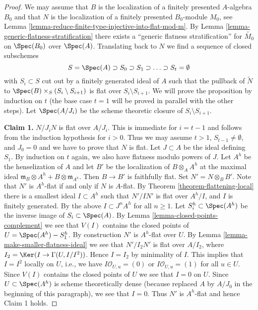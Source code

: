 \begin{proof}
We may assume that $B$ is the localization of a finitely presented
$A$-algebra $B_0$ and that $N$ is the localization of a
finitely presented $B_0$-module $M_0$, see
Lemma \ref{lemma-reduce-finite-type-injective-into-flat-mod-m}.
By Lemma \ref{lemma-generic-flatness-stratification}
there exists a ``generic flatness stratification''
for $\widetilde{M_0}$ on $\Spec(B_0)$ over $\Spec(A)$.
Translating back to $N$ we find a sequence of closed subschemes
$$
S = \Spec(A) \supset S_0 \supset S_1 \supset \ldots \supset S_t = \emptyset
$$
with $S_i \subset S$ cut out by a finitely generated ideal of $A$
such that the pullback of $\widetilde{N}$ to
$\Spec(B) \times_S (S_i \setminus S_{i + 1})$ is flat over
$S_i \setminus S_{i + 1}$. We will prove the proposition by
induction on $t$ (the base case $t = 1$ will be proved in parallel
with the other steps). Let $\Spec(A/J_i)$ be the scheme theoretic
closure of $S_i \setminus S_{i + 1}$.

\medskip\noindent
{\bf Claim 1.} $N/J_iN$ is flat over $A/J_i$. This is immediate for
$i = t - 1$ and follows from the induction hypothesis for $i > 0$.
Thus we may assume $t > 1$, $S_{t - 1} \not = \emptyset$, and
$J_0 = 0$ and we have to prove that $N$ is flat. Let $J \subset A$
be the ideal defining $S_1$. By induction on $t$ again, we also
have flatness modulo powers of $J$. Let $A^h$ be the henselization of $A$
and let $B'$ be the localization of $B \otimes_A A^h$ at the maximal ideal
$\mathfrak m_B \otimes A^h + B \otimes \mathfrak m_{A^h}$. Then $B \to B'$
is faithfully flat. Set $N' = N \otimes_B B'$. Note that $N'$
is $A^h$-flat if and only if $N$ is $A$-flat. By
Theorem \ref{theorem-flattening-local} there is a smallest ideal
$I \subset A^h$ such that $N'/IN'$ is flat over $A^h/I$, and
$I$ is finitely generated. By the above $I \subset J^nA^h$ for
all $n \geq 1$. Let $S_i^h \subset \Spec(A^h)$ be the inverse image
of $S_i \subset \Spec(A)$. By Lemma \ref{lemma-closed-points-complement}
we see that $V(I)$ contains the closed points of $U = \Spec(A^h) - S_1^h$.
By construction $N'$ is $A^h$-flat over $U$.
By Lemma \ref{lemma-make-smaller-flatness-ideal} we see that $N'/I_2N'$
is flat over $A/I_2$, where
$I_2 = \Ker(I \to \Gamma(U, I/I^2))$. Hence $I = I_2$ by minimality
of $I$. This implies that $I = I^2$ locally on $U$, i.e.,
we have $I\mathcal{O}_{U, u} = (0)$ or $I\mathcal{O}_{U, u} = (1)$
for all $u \in U$. Since $V(I)$ contains the closed points of $U$
we see that $I = 0$ on $U$. Since $U \subset \Spec(A^h)$ is scheme
theoretically dense (because replaced $A$ by $A/J_0$ in the beginning
of this paragraph), we see that $I = 0$. Thus $N'$ is $A^h$-flat
and hence Claim 1 holds.


\end{proof}
